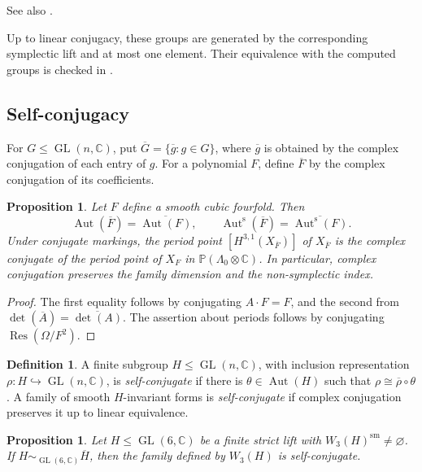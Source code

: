 \documentclass[12pt]{amsart}
\numberwithin{equation}{section}
\theoremstyle{plain}
\newtheorem{prop}[thm]{Proposition}
\theoremstyle{definition}
\newtheorem{defn}[thm]{Definition}
\theoremstyle{remark}
\newcommand{\CC}{\mathbb C}
\newcommand{\PP}{\mathbb P}
\DeclareMathOperator{\Aut}{Aut}
\DeclareMathOperator{\GL}{GL}
\newcommand{\Auts}{\Aut^{\mathrm s}}
\begin{document}
See also .

Up to linear conjugacy, these groups are generated by the corresponding symplectic lift and at most one element.
Their equivalence with the computed groups is checked in
\cite{FuWangZhengAutcub4fold2026}.

\subsection{Self-conjugacy}
\label{subsec:self-conjugacy}

For $G\leq\GL(n,\CC)$, put
$\overline G=\{\overline g:g\in G\}$, where $\overline g$ is obtained by
the complex conjugation of each entry of $g$.  For a polynomial $F$,
define $\overline F$ by the complex conjugation of its coefficients.

\begin{prop}\label{prop:conjugation}
Let $F$ define a smooth cubic fourfold.  Then
\[
\Aut(\overline F)=\overline{\Aut(F)},\qquad
\Auts(\overline F)=\overline{\Auts(F)}.
\]
Under conjugate markings, the period point $[H^{3,1}(X_{\overline{F}})]$ of $X_{\overline F}$ is the
complex conjugate of the period point of $X_F$ in $\PP(\Lambda_{0}\otimes \CC)$.  In particular, complex
conjugation preserves the family dimension and the non-symplectic index.
\end{prop}

\begin{proof}
The first equality follows by conjugating $A\cdot F=F$, and the second from
$\det(\overline A)=\overline{\det(A)}$.  The assertion about periods follows
by conjugating $\operatorname{Res}(\Omega/F^2)$.
\end{proof}

\begin{defn}
A finite subgroup $H\leq\GL(n,\CC)$, with inclusion representation
$\rho:H\hookrightarrow\GL(n,\CC)$, is \emph{self-conjugate} if there is
$\theta\in\Aut(H)$ such that $\rho\cong\overline\rho\circ\theta$. A family
of smooth $H$-invariant forms is \emph{self-conjugate} if complex
conjugation preserves it up to linear equivalence.
\end{defn}

\begin{prop}\label{prop:self-conjugacy-criterion}
Let $H\leq\GL(6,\CC)$ be a finite strict lift with
$W_3(H)^{\mathrm{sm}}\ne\varnothing$. If
$H\sim_{\GL(6,\CC)}\overline H$, then the family defined by $W_3(H)$ is
self-conjugate.
\end{prop}
\end{document}

